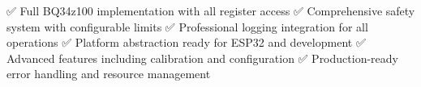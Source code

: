 ✅ Full BQ34z100 implementation with all register access ✅ Comprehensive safety system with configurable limits ✅ Professional logging integration for all operations ✅ Platform abstraction ready for ESP32 and development ✅ Advanced features including calibration and configuration ✅ Production-\/ready error handling and resource management 